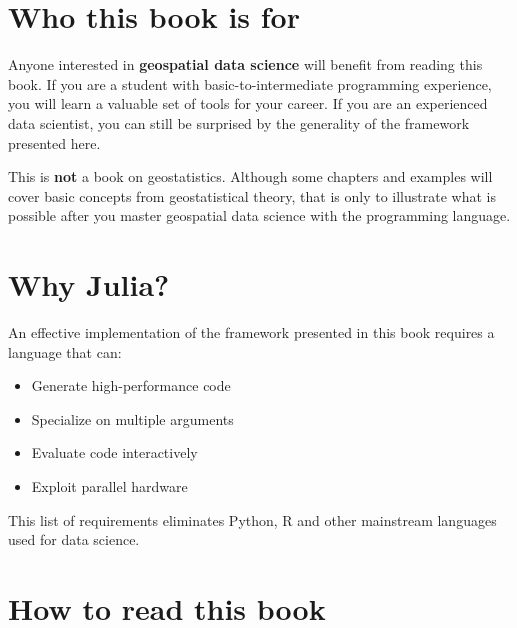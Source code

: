 \documentclass[
  letterpaper,
  DIV=11,
  numbers=noendperiod]{scrreprt}
\providecommand{\tightlist}{%
  \setlength{\itemsep}{0pt}\setlength{\parskip}{0pt}}\usepackage{longtable,booktabs,array}
\begin{document}

\hypertarget{who-this-book-is-for}{%
\section*{Who this book is for}\label{who-this-book-is-for}}


Anyone interested in \textbf{geospatial data science} will benefit from
reading this book. If you are a student with basic-to-intermediate
programming experience, you will learn a valuable set of tools for your
career. If you are an experienced data scientist, you can still be
surprised by the generality of the framework presented here.

This is \textbf{not} a book on geostatistics. Although some chapters and
examples will cover basic concepts from geostatistical theory, that is
only to illustrate what is possible after you master geospatial data
science with the
\href{https://julialang.org}{}
programming language.

\hypertarget{why-julia}{%
\section*{Why Julia?}\label{why-julia}}


An effective implementation of the framework presented in this book
requires a language that can:

\begin{itemize}
\tightlist
\item
  Generate high-performance code
\item
  Specialize on multiple arguments
\item
  Evaluate code interactively
\item
  Exploit parallel hardware
\end{itemize}

This list of requirements eliminates Python, R and other mainstream
languages used for data science.

\hypertarget{how-to-read-this-book}{%
\section*{How to read this book}\label{how-to-read-this-book}}
\end{document}
